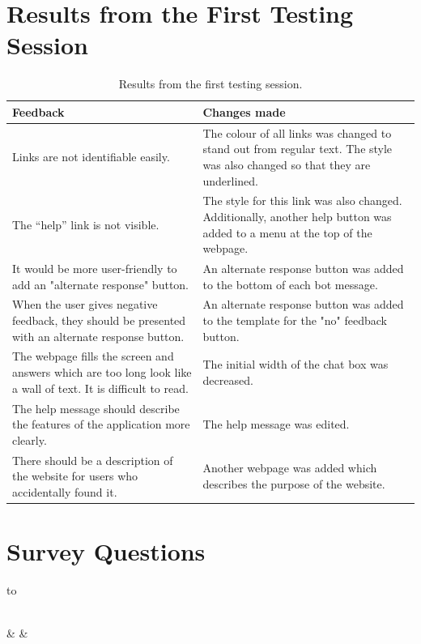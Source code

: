 \documentclass[12pt,a4paper]{article}
\newcommand{\captionstyle}[1] {
    \small{#1}
}
\begin{document}
\begin{appendices}
\section{Results from the First Testing Session}\label{app:sesh1}
\begin{table}[!htb]
    \centering
    \renewcommand\arraystretch{1.6}
    \caption{\captionstyle{Results from the first testing session.}}
    \label{tbl:sesh1}
    \begin{tabularx}{\textwidth}{XX}
    \toprule
    \textbf{Feedback} & \textbf{Changes made}  \\
    \midrule
    Links are not identifiable easily. & The colour of all links was changed to stand out from regular text. The style was also  changed so that they are underlined. \\
    The \enquote{help} link is not visible. & The style for this link was also changed.  Additionally, another help button was added to a menu at the top of the webpage. \\
    It would be more user-friendly to add an "alternate response" button. & An alternate response button was added to the bottom of each bot message.\\
    When the user gives negative feedback, they should be presented with an alternate  response button. & An alternate response button was added to the template for the "no" feedback button. \\
    The webpage fills the screen and  answers which are too long look like a wall of text. It is difficult to read. & The initial width of the chat box was decreased. \\
    The help message should describe the features of the application more clearly. & The help message was edited. \\
    There should be a description of the website for users who accidentally found it. & Another webpage was added which describes the purpose of the website.\\
    \bottomrule
    \end{tabularx}
\end{table}%

\newpage
\section{Survey Questions}\label{app:surveyqs}
\renewcommand\arraystretch{1.8}
\begin{longtabu} to \textwidth {cX[1]X[1]}
    \caption{\captionstyle{The questions each tester was asked in the survey and their possible answers.}} \label{tbl:sureyqs} \\
    \toprule
     &  &  \\
    \endfirsthead


\end{longtabu}
\end{appendices}
\end{document}
